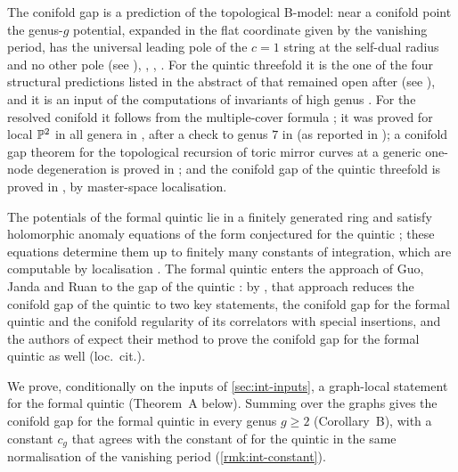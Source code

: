 The conifold gap is a prediction of the topological B-model: near a conifold point the genus-$g$ potential, expanded in the flat coordinate given by the vanishing period, has the universal leading pole of the $c=1$ string at the self-dual radius and no other pole \cite{Bershadsky:1993cx} (see \cite[\S1]{HKQ09}), \cite{Ghoshal:1995wm}, \cite[\S2.3]{HK07}, \cite[(1.2)]{HKQ09}. For the quintic threefold it is the one of the four structural predictions listed in the abstract of \cite{GJR18} that remained open after \cite{GJR18,CGL21,CGL26} (see \cite[Remark~1.6]{GJR18}), and it is an input of the computations of invariants of high genus \cite{HKQ09,LR22}. For the resolved conifold it follows from the multiple-cover formula \cite[\S1.1, footnote~1]{Br25}; it was proved for local $\mathbb{P}^2$ in all genera in \cite{Br25}, after a check to genus $7$ in \cite{CI21} (as reported in \cite[\S1.2]{Br25}); a conifold gap theorem for the topological recursion of toric mirror curves at a generic one-node degeneration is proved in \cite{FCCZ26}; and the conifold gap of the quintic threefold is proved in \cite[Theorem~2]{CGYZ26}, by master-space localisation.

The potentials of the formal quintic lie in a finitely generated ring and satisfy holomorphic anomaly equations of the form conjectured for the quintic \cite[Theorems~1 and~2]{LP20}; these equations determine them up to finitely many constants of integration, which are computable by localisation \cite[\S0.4]{LP20}. The formal quintic enters the approach of Guo, Janda and Ruan to the gap of the quintic \cite{GJR18}: by \cite[Remark~1.9]{CGYZ26}, that approach reduces the conifold gap of the quintic to two key statements, the conifold gap for the formal quintic and the conifold regularity of its correlators with special insertions, and the authors of \cite{CGYZ26} expect their method to prove the conifold gap for the formal quintic as well (loc.\ cit.).

We prove, conditionally on the inputs of \cref{sec:int-inputs}, a graph-local statement for the formal quintic (Theorem~A below). Summing over the graphs gives the conifold gap for the formal quintic in every genus $g\geq2$ (Corollary~B), with a constant $c_g$ that agrees with the constant of \cite[Conjecture~1.5]{CGYZ26} for the quintic in the same normalisation of the vanishing period (\cref{rmk:int-constant}).

